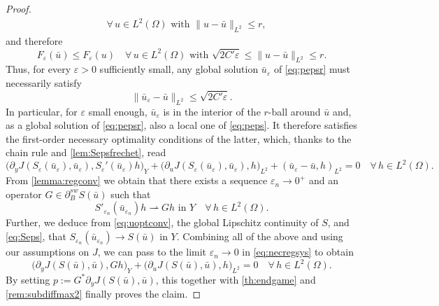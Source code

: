 \documentclass[reqno]{shinyart}
\begin{document}
\begin{proof}
\begin{align*}
        \quad \forall \, u \in L^2(\Omega) \text{ with } \|u - \bar{u}\|_{L^2} \leq r,
    \end{align*}
    and therefore
    \begin{equation*}
        F_\varepsilon(\bar{u})  \leq F_\varepsilon(u) 
        \quad \forall \,u \in L^2(\Omega) 
        \text{ with } \sqrt{ 2 C'  \varepsilon} \leq \|u - \bar{u}\|_{L^2} \leq r.
    \end{equation*}
    Thus, for every $\varepsilon > 0$ sufficiently small, any global solution $\bar{u}_\varepsilon$ 
    of \eqref{eq:pepsr} must necessarily satisfy
    \begin{equation}\label{eq:uoptconv}
        \|\bar{u}_\varepsilon - \bar{u}\|_{L^2} \leq \sqrt{ 2 C'  \varepsilon}.
    \end{equation}
    In particular, for $\varepsilon$ small enough, $\bar{u}_\varepsilon$ 
    is in the interior of the $r$-ball around $\bar{u}$ and, as a global solution of \eqref{eq:pepsr}, 
    also a local one of \eqref{eq:peps}. It therefore satisfies the first-order necessary 
    optimality conditions of the latter, which, thanks to the chain rule and \cref{lem:Sepsfrechet},
    read
    \begin{equation}
        \big(\partial_y J(S_\varepsilon(\bar{u}_\varepsilon), \bar{u}_\varepsilon), 
        S_\varepsilon'( \bar{u}_\varepsilon)h \big)_{Y}
        + \big( \partial_u J(S_\varepsilon(\bar{u}_\varepsilon), \bar{u}_\varepsilon), 
        h \big )_{L^2} 
        + ( \bar{u}_\varepsilon - \bar{u}  , h )_{L^2} 
        = 0\quad \forall \, h \in L^2(\Omega). \label{eq:necregsys}
    \end{equation}
    From \cref{lemma:regconv} we obtain that there exists a sequence 
    $\varepsilon_n \to 0^+$ and an operator $G \in \partial_{B}^{sw} S(\bar{u})$ such that 
    \begin{equation*}
        S'_{\varepsilon_{n}}(\bar{u}_{\varepsilon_n})h 
    \rightharpoonup G h \text{ in } Y\quad \forall \,h \in L^2(\Omega).
    \end{equation*}
    Further, we deduce from \eqref{eq:uoptconv}, the global Lipschitz continuity of $S$, 
    and \eqref{eq:Seps}, that $S_{\varepsilon_{n}}(\bar{u}_{\varepsilon_n})  \to S(\bar{u})$ 
    in $Y$. Combining all of the above and using our assumptions on $J$, we can pass to the limit 
    $\varepsilon_n \to 0$ in \eqref{eq:necregsys} to obtain 
    \begin{equation*}
        \big(\partial_y J(S (\bar{u} ), \bar{u} ), G h \big )_{Y}  
        + \big ( \partial_u J(S(\bar{u} ), \bar{u} ), h \big )_{L^2} 
        =  0 \quad   \forall\, h \in L^2(\Omega).
    \end{equation*}
    By setting $p := G^* \partial_y J(S (\bar{u} ), \bar{u} )$, this together with  
    \cref{th:endgame} and \cref{rem:subdiffmax2} finally proves the claim.
\end{proof}
\end{document}
